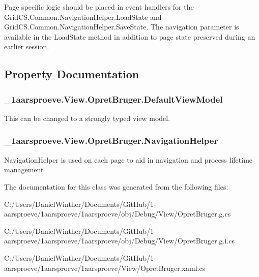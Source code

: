 Page specific logic should be placed in event handlers for the Grid\+C\+S.\+Common.\+Navigation\+Helper.\+Load\+State and Grid\+C\+S.\+Common.\+Navigation\+Helper.\+Save\+State. The navigation parameter is available in the Load\+State method in addition to page state preserved during an earlier session. 

\subsection{Property Documentation}
\hypertarget{class__1aarsproeve_1_1_view_1_1_opret_bruger_a597c247fbbf117d6d4ae8156433eb366}{}
\subsubsection[{Default\+View\+Model}]{ \+\_\+1aarsproeve.\+View.\+Opret\+Bruger.\+Default\+View\+Model\hspace{0.3cm}{\ttfamily [get]}}\label{class__1aarsproeve_1_1_view_1_1_opret_bruger_a597c247fbbf117d6d4ae8156433eb366}


This can be changed to a strongly typed view model. 

\hypertarget{class__1aarsproeve_1_1_view_1_1_opret_bruger_a3d67fd01a377d0a23130f57e9f785a46}{}
\subsubsection[{Navigation\+Helper}]{ \+\_\+1aarsproeve.\+View.\+Opret\+Bruger.\+Navigation\+Helper\hspace{0.3cm}{\ttfamily [get]}}\label{class__1aarsproeve_1_1_view_1_1_opret_bruger_a3d67fd01a377d0a23130f57e9f785a46}


Navigation\+Helper is used on each page to aid in navigation and process lifetime management 



The documentation for this class was generated from the following files\+:\begin{DoxyCompactItemize}
\item 
C\+:/\+Users/\+Daniel\+Winther/\+Documents/\+Git\+Hub/1-\/aarsproeve/1aarsproeve/1aarsproeve/obj/\+Debug/\+View/Opret\+Bruger.\+g.\+cs\item 
C\+:/\+Users/\+Daniel\+Winther/\+Documents/\+Git\+Hub/1-\/aarsproeve/1aarsproeve/1aarsproeve/obj/\+Debug/\+View/Opret\+Bruger.\+g.\+i.\+cs\item 
C\+:/\+Users/\+Daniel\+Winther/\+Documents/\+Git\+Hub/1-\/aarsproeve/1aarsproeve/1aarsproeve/\+View/Opret\+Bruger.\+xaml.\+cs\end{DoxyCompactItemize}
